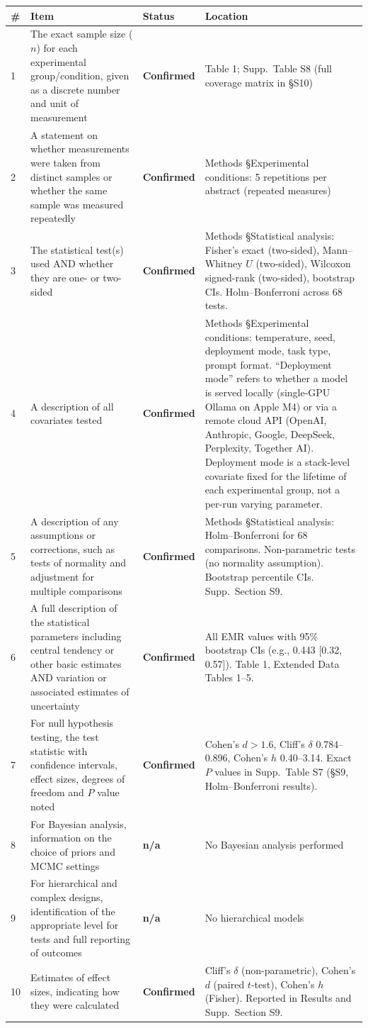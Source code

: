 \documentclass[11pt]{article}
\newcommand{\confirmed}{\textbf{Confirmed}}
\newcommand{\notapplicable}{\textbf{n/a}}
\begin{document}
\begin{longtable}{@{}p{}p{}p{}p{}@{}}
\toprule
\textbf{\#} & \textbf{Item} & \textbf{Status} & \textbf{Location} \\
\midrule
\endhead
1 & The exact sample size ($n$) for each experimental group/condition, given as a discrete number and unit of measurement & \confirmed & Table 1; Supp.\ Table S8 (full coverage matrix in \S S10) \\[6pt]
2 & A statement on whether measurements were taken from distinct samples or whether the same sample was measured repeatedly & \confirmed & Methods \S Experimental conditions: 5 repetitions per abstract (repeated measures) \\[6pt]
3 & The statistical test(s) used AND whether they are one- or two-sided & \confirmed & Methods \S Statistical analysis: Fisher's exact (two-sided), Mann--Whitney $U$ (two-sided), Wilcoxon signed-rank (two-sided), bootstrap CIs. Holm--Bonferroni across 68 tests. \\[6pt]
4 & A description of all covariates tested & \confirmed & Methods \S Experimental conditions: temperature, seed, deployment mode, task type, prompt format. ``Deployment mode'' refers to whether a model is served locally (single-GPU Ollama on Apple M4) or via a remote cloud API (OpenAI, Anthropic, Google, DeepSeek, Perplexity, Together AI). Deployment mode is a stack-level covariate fixed for the lifetime of each experimental group, not a per-run varying parameter. \\[6pt]
5 & A description of any assumptions or corrections, such as tests of normality and adjustment for multiple comparisons & \confirmed & Methods \S Statistical analysis: Holm--Bonferroni for 68 comparisons. Non-parametric tests (no normality assumption). Bootstrap percentile CIs. Supp.\ Section S9. \\[6pt]
6 & A full description of the statistical parameters including central tendency or other basic estimates AND variation or associated estimates of uncertainty & \confirmed & All EMR values with 95\% bootstrap CIs (e.g., 0.443 [0.32, 0.57]). Table 1, Extended Data Tables 1--5. \\[6pt]
7 & For null hypothesis testing, the test statistic with confidence intervals, effect sizes, degrees of freedom and $P$ value noted & \confirmed & Cohen's $d > 1.6$, Cliff's $\delta$ 0.784--0.896, Cohen's $h$ 0.40--3.14. Exact $P$ values in Supp.\ Table S7 (\S S9, Holm--Bonferroni results). \\[6pt]
8 & For Bayesian analysis, information on the choice of priors and MCMC settings & \notapplicable & No Bayesian analysis performed \\[6pt]
9 & For hierarchical and complex designs, identification of the appropriate level for tests and full reporting of outcomes & \notapplicable & No hierarchical models \\[6pt]
10 & Estimates of effect sizes, indicating how they were calculated & \confirmed & Cliff's $\delta$ (non-parametric), Cohen's $d$ (paired $t$-test), Cohen's $h$ (Fisher). Reported in Results and Supp.\ Section S9. \\
\bottomrule
\end{longtable}
\end{document}
